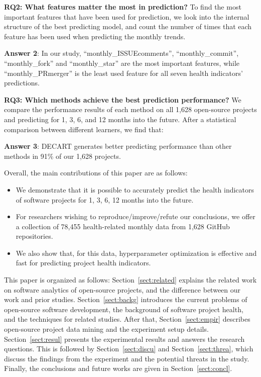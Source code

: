 \documentclass[sigconf,review,anonymous]{acmart}
\newcommand{\bi}{\begin{itemize}}
\newcommand{\ei}{\end{itemize}}
\begin{document}
\textbf{RQ2: What features matter the most in prediction?}
To find the most important features that have been used for prediction, we look into the internal structure of the best predicting model, and count the number of times that each feature has been used when predicting the monthly trends.


\begin{blockquote}
\noindent
\textbf{Answer 2}: In our study, ``monthly\_ISSUEcomments'', ``monthly\_commit'', ``monthly\_fork'' and ``monthly\_star'' are the most important features, while ``monthly\_PRmerger'' is the least used feature for all seven health indicators' predictions.
\end{blockquote}



\textbf{RQ3: Which methods achieve the best prediction performance?}
We compare the performance results of each method on all 1,628 open-source projects and predicting for 1, 3, 6, and 12 months into the future. After a statistical comparison between different learners, we find that:  

\begin{blockquote}
\noindent
\textbf{Answer 3}: DECART generates better predicting performance than other methods in 91\% of our 1,628 projects.
\end{blockquote}



 
Overall, the main contributions of this paper are as follows:
\bi
\item  
We demonstrate that it is possible to accurately  predict the health indicators of software projects for 1, 3, 6, 12 months into the future.
\item For  researchers wishing to reproduce/improve/refute our conclusions, we offer a  collection of 78,455 health-related monthly data from 1,628 GitHub repositories. 
\item We also show that, for this data, hyperparameter optimization is effective and fast for predicting project health indicators.

\ei 
 

  
 
 
This paper is organized as follows:
Section~\ref{sect:related} explains the related work on software analytics of open-source projects, and the difference between our work and prior studies.
Section~\ref{sect:backg} introduces the current problems of open-source software development, the background of software project health, and the techniques for related studies.
After that, Section~\ref{sect:empir} describes open-source project data mining and the experiment setup details. 
Section~\ref{sect:resul} presents the experimental results and answers the research questions. 
This is followed by Section~\ref{sect:discu} and Section~\ref{sect:threa}, which discuss the findings from the experiment and the potential threats in the study. 
Finally, the conclusions and future works are given in Section~\ref{sect:concl}.
\end{document}
